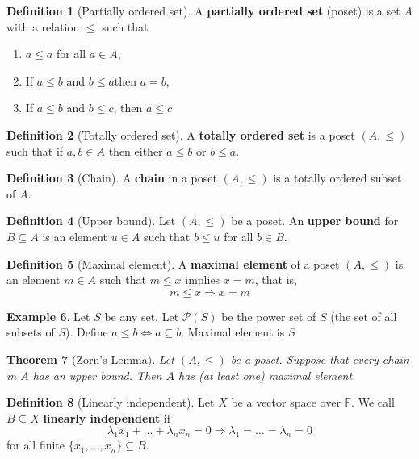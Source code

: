 \documentclass[justified]{tufte-book}
\theoremstyle{plain}%
\newtheorem{thm}{Theorem}[chapter]
\theoremstyle{definition}
\newtheorem{defn}[thm]{Definition}
\newtheorem{exmp}[thm]{Example}
\theoremstyle{remark}
\newcommand{\F}{\mathbb{F}}
\begin{document}
\begin{defn}[Partially ordered set]
  A \textbf{partially ordered set} (poset) is a set $A$ with a relation $\leq$ such that 
  \begin{enumerate}[(1)]
      \item $ a \leq a$ for all $a \in A$,
      \item If $a \leq b$ and $b \leq a$then $a = b$,
      \item If $a \leq b$ and $b \leq c$, then $a \leq c$
  \end{enumerate}
\end{defn}

\begin{defn}[Totally ordered set]
  A \textbf{totally ordered set} is a poset $(A, \leq)$ such that if $a, b \in A$ then either $a \leq b$ or $b \leq a$.
\end{defn}

\begin{defn}[Chain]
  A \textbf{chain} in a poset $(A, \leq)$ is a totally ordered subset of $A$.
\end{defn}

\begin{defn}[Upper bound]
  Let $(A, \leq)$ be a poset.  An \textbf{upper bound} for $B \subseteq A$ is an element $u \in A$ such that $b \leq u$ for all $ b \in B$.  
\end{defn}

\begin{defn}[Maximal element]
  A \textbf{maximal element} of a poset $(A, \leq)$ is an element $m \in A$ such that $m \leq x$ implies $x = m$, that is, \[
      m \leq x \Rightarrow x = m
  \]
\end{defn}

\begin{exmp}
  Let $S$ be any set.  Let $\mathcal{P}(S)$ be the power set of $S$ (the set of all subsets of $S$).  Define $a \leq b \iff a \subseteq b$.  Maximal element is $S$
\end{exmp}

\begin{thm}[Zorn's Lemma]
  Let $(A, \leq)$ be a poset.  Suppose that every chain in $A$ has an upper bound.  Then $A$ has (at least one) maximal element.  
\end{thm}

\begin{defn}[Linearly independent]
      Let $X$ be a vector space over $\F$.  We call $B \subseteq X$ \textbf{linearly independent} if \[
          \lambda_1 x_1 + \dots + \lambda_n x_n = 0 \Rightarrow \lambda_1 = \dots = \lambda_n = 0
      \] for all finite $\{ x_1, \dots, x_n \} \subseteq B$. 
  \end{defn}
  
\end{document}
